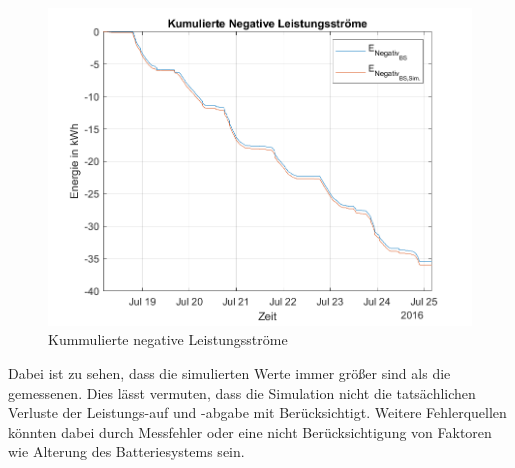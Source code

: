 \begin{figure}[H]
    \centering
    \includegraphics[width=\textwidth]{Abbildungen/plot6.png}
    \caption{Kummulierte negative Leistungsströme}
    \label{fig:plot1_230730_3}
\end{figure}
Dabei ist zu sehen, dass die simulierten Werte immer größer sind als die gemessenen. Dies lässt vermuten, dass die Simulation 
nicht die tatsächlichen Verluste der Leistungs-auf und -abgabe mit Berücksichtigt. Weitere Fehlerquellen könnten dabei durch Messfehler oder eine nicht Berücksichtigung von Faktoren wie Alterung des Batteriesystems sein.\\


